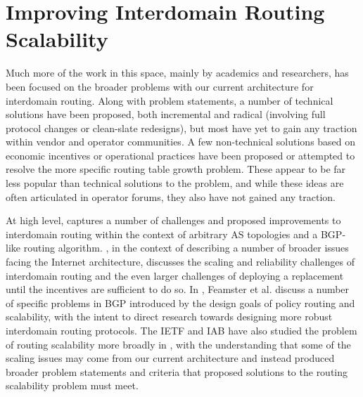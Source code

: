 \section{Improving Interdomain Routing Scalability}

Much more of the work in this space, mainly by academics and researchers, has
been focused on the broader problems with our current architecture for
interdomain routing. Along with problem statements, a number of technical
solutions have been proposed, both incremental and radical (involving full
protocol changes or clean-slate redesigns), but most have yet to gain any
traction within vendor and operator communities. A few non-technical solutions
based on economic incentives or operational practices have been proposed or
attempted to resolve the more specific routing table growth problem. These
appear to be far less popular than technical solutions to the problem, and
while these ideas are often articulated in operator forums, they also have not
gained any traction.

At high level, \cite{Yannuzzi:2005hc} captures a number of challenges and
proposed improvements to interdomain routing within the context of arbitrary AS
topologies and a BGP-like routing algorithm. \cite{Handley:2006kx}, in the
context of describing a number of broader issues facing the Internet
architecture, discusses the scaling and reliability challenges of interdomain
routing and the even larger challenges of deploying a replacement until the
incentives are sufficient to do so. In \cite{Feamster:2004nx}, Feamster et al.
discuss a number of specific problems in BGP introduced by the design goals of
policy routing and scalability, with the intent to direct research towards
designing more robust interdomain routing protocols. The IETF and IAB have also
studied the problem of routing scalability more broadly in \cite{rfc4984}, with
the understanding that some of the scaling issues may come from our current
architecture and instead produced broader problem statements and criteria that
proposed solutions to the routing scalability problem must meet.


